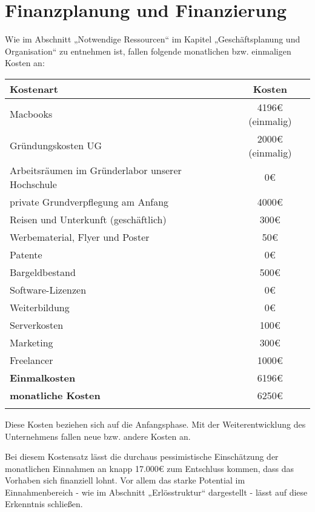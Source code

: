 \chapter{Finanzplanung und Finanzierung}

Wie im Abschnitt „Notwendige Ressourcen“ im Kapitel „Geschäftsplanung und Organisation“ zu entnehmen ist, fallen folgende monatlichen bzw. einmaligen Kosten an: \\

\begin{tabular}{lc}
  \textbf{Kostenart} & \textbf{Kosten} \\
  \hline
  Macbooks & 4196{\euro} (einmalig) \\
  Gründungskosten UG & 2000{\euro} (einmalig) \\
  Arbeitsräumen im Gründerlabor unserer Hochschule & 0\euro \\
  private Grundverpflegung am Anfang & 4000\euro \\
  Reisen und Unterkunft (geschäftlich) & 300\euro \\
  Werbematerial, Flyer und Poster & 50\euro \\
  Patente & 0\euro \\
  Bargeldbestand & 500\euro \\
  Software-Lizenzen & 0\euro \\
  Weiterbildung & 0\euro \\
  Serverkosten & 100\euro \\
  Marketing & 300\euro \\
  Freelancer & 1000\euro \\
  \hline
  \textbf{Einmalkosten} & 6196{\euro} \\
  \textbf{monatliche Kosten} & 6250\euro \\
  \hline  \\
 \end{tabular}

Diese Kosten beziehen sich auf die Anfangsphase. Mit der Weiterentwicklung des Unternehmens fallen neue bzw. andere Kosten an.

Bei diesem Kostensatz lässt die durchaus pessimistische Einschätzung der monatlichen Einnahmen an knapp 17.000{\euro} zum Entschluss kommen, dass das Vorhaben sich finanziell lohnt. Vor allem das starke Potential im Einnahmenbereich - wie im Abschnitt „Erlösstruktur“ dargestellt - lässt auf diese Erkenntnis schließen.

